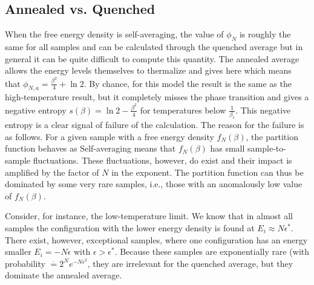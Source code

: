 \documentclass[letterpaper,english,10pt]{article}
\begin{document}
\subsection{Annealed vs. Quenched}
When the free energy density is self-averaging, the value of $\phi_N$ is roughly the same for all samples and can be calculated through the quenched average
but in general it can be quite difficult to compute this quantity. 
The annealed average
allows the energy levels themselves to thermalize and gives here
which means that $\phi_{N,a} = \frac{\beta^2}{4}+\ln2$. 
By chance, for this model the result is the same as the high-temperature result, but it completely misses the phase transition and gives a negative entropy $s(\beta) = \ln2-\frac{\beta^2}{4}$ for temperatures below $\frac{1}{\beta_c}$.  
This negative entropy is a clear signal of failure of the calculation. 
The reason for the failure is as follows. 
For a given sample with a free energy density $f_N (\beta)$, the partition function behaves as 
Self-averaging means that $f_N(\beta)$ has small sample-to-sample fluctuations. 
These fluctuations, however, do exist and their impact is amplified by the factor of $N$ in the exponent. The partition function can thus be dominated by some very rare samples, i.e., those with an anomalously low value of $f_N(\beta)$. 

Consider, for instance, the low-temperature limit. 
We know that in almost all samples the configuration with the lower energy density is found at $E_i \approx N\epsilon^\ast$. 
There exist, however, exceptional samples, where one configuration has an energy smaller $E_i = -N\epsilon$ with $\epsilon > \epsilon^\ast$. 
Because these samples are exponentially rare (with probability $\stackrel{\cdot}{=}2^Ne^{-N\epsilon^2}$, they are irrelevant for the quenched average, but they dominate the annealed average.
\appendix
\end{document}
